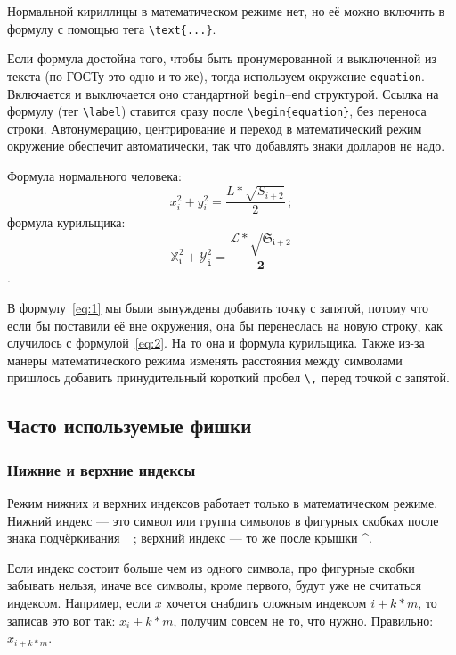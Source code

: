 \documentclass[14pt, russian]{scrartcl}
\begin{document}
Нормальной кириллицы в математическом режиме нет, но её можно включить в формулу с помощью тега \texttt{\textbackslash text\{...\}}. 

Если формула достойна того, чтобы быть пронумерованной и выключенной из текста (по ГОСТу это одно и то же), тогда используем окружение \texttt{equation}. Включается и выключается оно стандартной \texttt{begin}--\texttt{end} структурой. Ссылка на формулу (тег \texttt{\textbackslash label}) ставится сразу после \texttt{\textbackslash begin\{equation\}}, без переноса строки. Автонумерацию, центрирование и переход в математический режим окружение обеспечит автоматически, так что добавлять знаки долларов не надо.

\begin{Example}\label{Example:MathFont2}
Формула нормального человека: 
\begin{equation}\label{eq:1}
x_i^2 + y^2_i = \frac{L*\sqrt{S_{i+2}}}{2}\,;
\end{equation} 
формула курильщика: 
\begin{equation}\label{eq:2}
\mathbb{X}_\mathfrak{i}^\mathfrak{2} + \mathcal{Y}^\mathit{2}_\mathtt{i} = \frac{\mathscr{L}*\sqrt{\mathfrak{S}_\mathfrak{i+2}}}{\mathbf{2}}
\end{equation}.
\end{Example} 

В формулу~\ref{eq:1} мы были вынуждены добавить точку с запятой, потому что если бы поставили её вне окружения, она бы перенеслась на новую строку, как случилось с формулой~\ref{eq:2}. На то она и формула курильщика. Также из-за манеры математического режима изменять расстояния между символами пришлось добавить принудительный короткий пробел \texttt{\textbackslash ,} перед точкой с запятой. 

\subsection{Часто используемые фишки}
\subsubsection{Нижние и верхние индексы}

Режим нижних и верхних индексов работает только в математическом режиме. Нижний индекс --- это символ или группа символов в фигурных скобках после знака подчёркивания \_; верхний индекс --- то же после крышки \^{}.

Если индекс состоит больше чем из одного символа, про фигурные скобки забывать нельзя, иначе все символы, кроме первого, будут уже не считаться индексом. Например, если $x$ хочется снабдить сложным индексом $i+k*m$, то записав это вот так: $x_i+k*m$, получим совсем не то, что нужно. Правильно: $x_{i+k*m}$.
\end{document}
